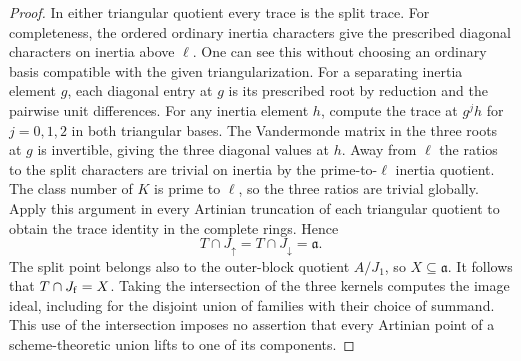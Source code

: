 \documentclass[a4paper,11pt]{article}
\theoremstyle{definition}
\theoremstyle{remark}
\numberwithin{equation}{section}
\begin{document}
\begin{proof}
In either triangular quotient every trace is the split trace.
For completeness, the ordered ordinary inertia characters give
the prescribed diagonal characters on inertia above \(\ell\).
One can see this without choosing an ordinary basis compatible
with the given triangularization. For a separating inertia
element \(g\), each diagonal entry at \(g\) is its prescribed
root by reduction and the pairwise unit differences. For any
inertia element \(h\), compute the trace at \(g^j h\) for
\(j=0,1,2\) in both triangular bases. The Vandermonde
matrix in the three roots at \(g\) is invertible, giving the
three diagonal values at \(h\). Away from \(\ell\) the ratios
to the split characters are trivial on inertia by the
prime-to-\(\ell\) inertia quotient. The class number of \(K\)
is prime to \(\ell\), so the three ratios are trivial globally.
Apply this argument in every Artinian truncation of each
triangular quotient to obtain the trace identity in the
complete rings. Hence
\[
 T\cap J_\uparrow=T\cap J_\downarrow=\mathfrak a .
\]
The split point belongs also to the outer-block quotient
\(A/J_1\), so \(X\subseteq\mathfrak a\).
It follows that \(T\cap J_{\rm f}=X\). Taking the intersection
of the three kernels computes the image ideal, including for
the disjoint union of families with their choice of summand.
This use of the intersection imposes no assertion that every
Artinian point of a scheme-theoretic union lifts to one of
its components.
\end{proof}
\end{document}
